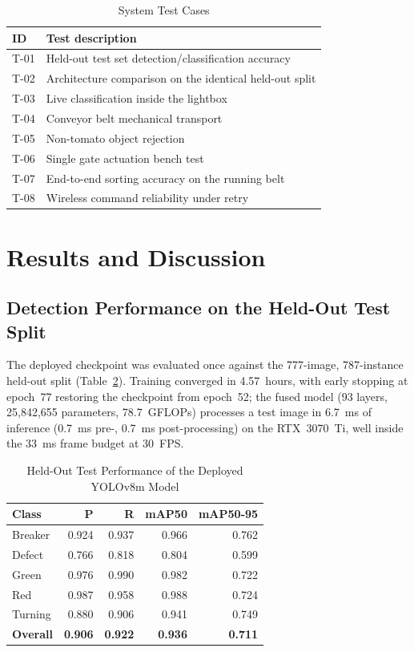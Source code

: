 \documentclass[journal]{IEEEtran}
\begin{document}
\begin{table}[!t]
\caption{System Test Cases}
\label{tab:testcases}
\centering
\begin{tabular}{p{0.5cm}p{7.3cm}}
\toprule
\textbf{ID} & \textbf{Test description} \\
\midrule
T-01 & Held-out test set detection/classification accuracy \\
T-02 & Architecture comparison on the identical held-out split \\
T-03 & Live classification inside the lightbox \\
T-04 & Conveyor belt mechanical transport \\
T-05 & Non-tomato object rejection \\
T-06 & Single gate actuation bench test \\
T-07 & End-to-end sorting accuracy on the running belt \\
T-08 & Wireless command reliability under retry \\
\bottomrule
\end{tabular}
\end{table}

\section{Results and Discussion}
\label{sec:results}

\subsection{Detection Performance on the Held-Out Test Split}
The deployed checkpoint was evaluated once against the 777-image, 787-instance held-out split (Table~\ref{tab:testresults}). Training converged in 4.57~hours, with early stopping at epoch~77 restoring the checkpoint from epoch~52; the fused model (93 layers, 25{,}842{,}655 parameters, 78.7~GFLOPs) processes a test image in 6.7~ms of inference (0.7~ms pre-, 0.7~ms post-processing) on the RTX~3070~Ti, well inside the 33~ms frame budget at 30~FPS.

\begin{table}[!t]
\caption{Held-Out Test Performance of the Deployed YOLOv8m Model}
\label{tab:testresults}
\centering
\begin{tabular}{lrrrr}
\toprule
\textbf{Class} & \textbf{P} & \textbf{R} & \textbf{mAP50} & \textbf{mAP50-95} \\
\midrule
Breaker & 0.924 & 0.937 & 0.966 & 0.762 \\
Defect  & 0.766 & 0.818 & 0.804 & 0.599 \\
Green   & 0.976 & 0.990 & 0.982 & 0.722 \\
Red     & 0.987 & 0.958 & 0.988 & 0.724 \\
Turning & 0.880 & 0.906 & 0.941 & 0.749 \\
\midrule
\textbf{Overall} & \textbf{0.906} & \textbf{0.922} & \textbf{0.936} & \textbf{0.711} \\
\bottomrule
\end{tabular}
\end{table}
\end{document}
